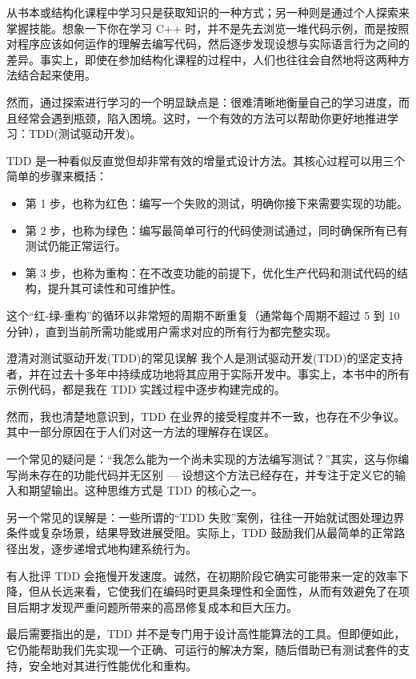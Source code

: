 
从书本或结构化课程中学习只是获取知识的一种方式；另一种则是通过个人探索来掌握技能。想象一下你在学习 C++ 时，并不是先去浏览一堆代码示例，而是按照对程序应该如何运作的理解去编写代码，然后逐步发现设想与实际语言行为之间的差异。事实上，即使在参加结构化课程的过程中，人们也往往会自然地将这两种方法结合起来使用。

然而，通过探索进行学习的一个明显缺点是：很难清晰地衡量自己的学习进度，而且经常会遇到瓶颈，陷入困境。这时，一个有效的方法可以帮助你更好地推进学习：TDD(测试驱动开发)。

TDD 是一种看似反直觉但却非常有效的增量式设计方法。其核心过程可以用三个简单的步骤来概括：

\begin{itemize}
\item 
第 1 步，也称为红色：编写一个失败的测试，明确你接下来需要实现的功能。

\item 
第 2 步，也称为绿色：编写最简单可行的代码使测试通过，同时确保所有已有测试仍能正常运行。

\item 
第 3 步，也称为重构：在不改变功能的前提下，优化生产代码和测试代码的结构，提升其可读性和可维护性。
\end{itemize}

这个“红-绿-重构”的循环以非常短的周期不断重复（通常每个周期不超过 5 到 10 分钟），直到当前所需功能或用户需求对应的所有行为都完整实现。

\begin{myTip}{澄清对测试驱动开发(TDD)的常见误解}
我个人是测试驱动开发(TDD)的坚定支持者，并在过去十多年中持续成功地将其应用于实际开发中。事实上，本书中的所有示例代码，都是我在 TDD 实践过程中逐步构建完成的。

然而，我也清楚地意识到，TDD 在业界的接受程度并不一致，也存在不少争议。其中一部分原因在于人们对这一方法的理解存在误区。

一个常见的疑问是：“我怎么能为一个尚未实现的方法编写测试？”其实，这与你编写尚未存在的功能代码并无区别 --- 设想这个方法已经存在，并专注于定义它的输入和期望输出。这种思维方式是 TDD 的核心之一。

另一个常见的误解是：一些所谓的“TDD 失败”案例，往往一开始就试图处理边界条件或复杂场景，结果导致进展受阻。实际上，TDD 鼓励我们从最简单的正常路径出发，逐步递增式地构建系统行为。

有人批评 TDD 会拖慢开发速度。诚然，在初期阶段它确实可能带来一定的效率下降，但从长远来看，它使我们在编码时更具条理性和全面性，从而有效避免了在项目后期才发现严重问题所带来的高昂修复成本和巨大压力。

最后需要指出的是，TDD 并不是专门用于设计高性能算法的工具。但即便如此，它仍能帮助我们先实现一个正确、可运行的解决方案，随后借助已有测试套件的支持，安全地对其进行性能优化和重构。
\end{myTip}

